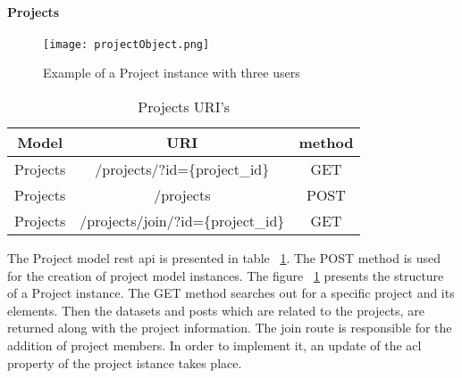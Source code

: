 \paragraph{Projects}
\begin{figure}
	\centerline{\texttt{[image: projectObject.png]}}
	\caption{Example of a Project instance with three users}
	\label{projectObject}
\end{figure}
\begin{table}[]
\centering
\begin{tabular}{|c|c|c|}
\hline
\rowcolor[HTML]{32CB00} 
\textbf{Model} & \textbf{URI}                   & \textbf{method} \\ \hline
\rowcolor[HTML]{FFFFFF} 
Projects       & /projects/?id=\{project\_id\}      & GET             \\ \hline
\rowcolor[HTML]{67FD9A} 
Projects       & /projects                      & POST            \\ \hline
\rowcolor[HTML]{FFFFFF} 
Projects       & /projects/join/?id=\{project\_id\} & GET             \\ \hline
\end{tabular}
\caption{Projects URI's}
\label{projectsURI}
\end{table}
The Project model rest api is presented in table ~\ref{projectsURI}. The POST method is used for the creation of project model instances. The  figure ~\ref{projectObject} presents the structure of a Project instance. The GET method searches out for a specific project and its elements. Then the datasets and posts which are related to the projects, are returned along with the project information. The join route is responsible for the addition of project members. In order to implement it, an update of the acl property of the project istance takes place.


